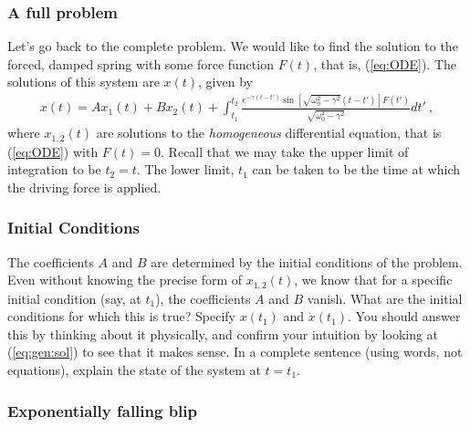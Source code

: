\documentclass[12pt]{article}
\numberwithin{equation}{subsection}    %
\begin{document}
\subsubsection{A full problem}

Let's go back to the complete problem. We would like to find the solution to the forced, damped spring with some force function $F(t)$, that is, (\ref{eq:ODE}). The solutions of this system are $x(t)$, given by 
\begin{align}
	x(t) = A x_1(t) + B x_2(t) 
	+ 
	\int_{t_1}^{t_2}
	\frac{
	e^{-\gamma(t-t')}
	\sin \left[
	\sqrt{\omega_0^2 - \gamma^2} (t-t')
	\right]
	F(t')
	}{
	\sqrt{\omega_0^2 - \gamma^2}
	}
	dt' \ ,
	\label{eq:gen:sol}
\end{align}
where $x_{1,2}(t)$ are solutions to the \emph{homogeneous} differential equation, that is (\ref{eq:ODE}) with $F(t)=0$. 
%
Recall that we may take the upper limit of integration to be $t_2 = t$. The lower limit, $t_1$ can be taken to be the time at which the driving force is applied. 

\subsubsection{Initial Conditions}

The coefficients $A$ and $B$ are determined by the initial conditions of the problem. 
%
Even without knowing the precise form of $x_{1,2}(t)$, we know that for a specific initial condition (say, at $t_1$), the coefficients $A$ and $B$ vanish. What are the initial conditions for which this is true? Specify $x(t_1)$ and $\dot x(t_1)$. You should answer this by thinking about it physically, and confirm your intuition by looking at (\ref{eq:gen:sol}) to see that it makes sense. In a complete sentence (using words, not equations), explain the state of the system at $t=t_1$. 

\subsubsection{Exponentially falling blip}
\end{document}
